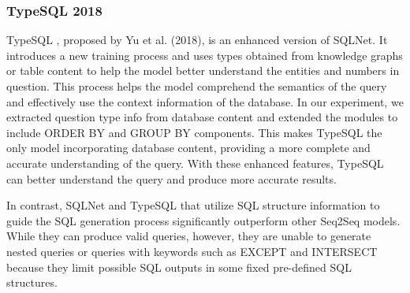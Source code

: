 \subsubsection{TypeSQL 2018}

TypeSQL \cite{DBLP:journals/corr/abs-1804-09769}, proposed by Yu et al. (2018), is an enhanced version of SQLNet. It introduces a new training process and uses types obtained from knowledge graphs or table content to help the model better understand the entities and numbers in question. This process helps the model comprehend the semantics of the query and effectively use the context information of the database. In our experiment, we extracted question type info from database content and extended the modules to include ORDER BY and GROUP BY components. This makes TypeSQL the only model incorporating database content, providing a more complete and accurate understanding of the query. With these enhanced features, TypeSQL can better understand the query and produce more accurate results.

In contrast, SQLNet and TypeSQL that utilize SQL structure information to guide the SQL generation process significantly outperform other Seq2Seq models. While they can produce valid queries, however, they are unable to generate nested queries or queries with keywords such as EXCEPT and INTERSECT because they limit possible SQL outputs in some fixed pre-defined SQL structures.